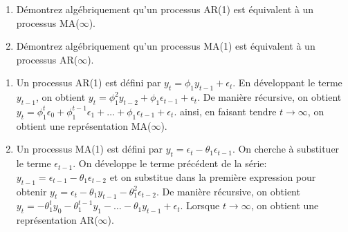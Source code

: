 \begin{exercice}
  \begin{enumerate}
\item 
Démontrez algébriquement qu'un processus AR(1) est équivalent à un processus MA($\infty$).

\item 
Démontrez algébriquement qu'un processus MA(1) est équivalent à un processus AR($\infty$).
\end{enumerate}
\begin{sol}
  \begin{enumerate}
\item Un processus AR(1) est défini par $y_t = \phi_1y_{t-1} + \epsilon_t$. En développant le terme $y_{t-1}$, on obtient $y_t = \phi_1^2y_{t-2}+\phi_1\epsilon_{t-1}+\epsilon_t$. De manière récursive, on obtient $y_t = \phi_1^{t}\epsilon_0 + \phi_1^{t-1}\epsilon_1 + \ldots + \phi_1\epsilon_{t-1} + \epsilon_t$. ainsi, en faisant tendre $t\to\infty$, on obtient une représentation MA($\infty$).

\item Un processus MA(1) est défini par $y_t = \epsilon_t - \theta_1\epsilon_{t-1}$. On cherche à substituer le terme $\epsilon_{t-1}$. On développe le terme précédent de la série: $y_{t-1} = \epsilon_{t-1} - \theta_1\epsilon_{t-2}$ et on substitue dans la première expression pour obtenir $y_t = \epsilon_t - \theta_1y_{t-1} - \theta_1^2\epsilon_{t-2}$. De manière récursive, on obtient $y_t = -\theta_1^ty_0-\theta_1^{t-1}y_1-\ldots-\theta_1y_{t-1}+\epsilon_{t}$. Lorsque $t\to\infty$, on obtient une représentation AR($\infty$).
\end{enumerate}
\end{sol}
\end{exercice}



